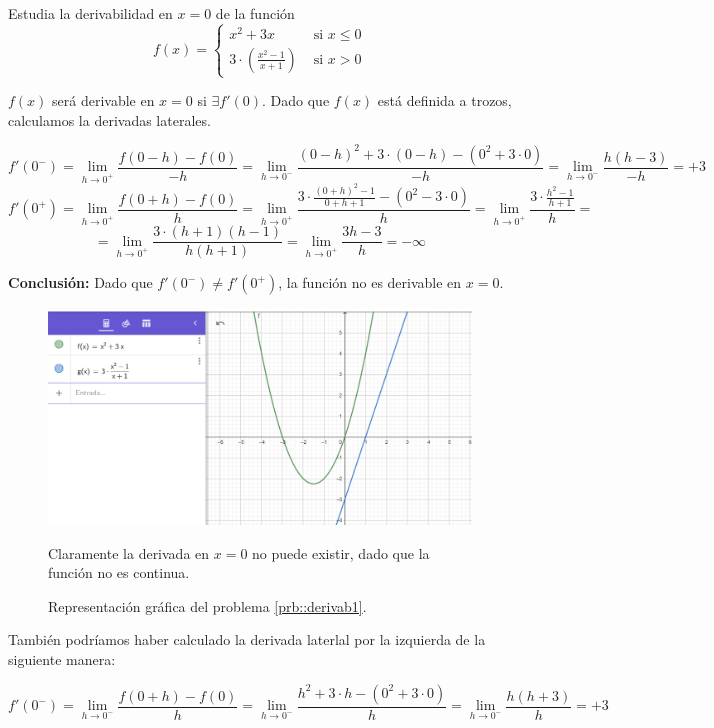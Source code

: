 \begin{problem} Estudia la derivabilidad en $x=0$ de la función 
\label{prb::derivab1}
\[f(x) = \begin{cases} x^2+3x & \text{ si } x\leq 0\\ 3·\left(\frac{x^2-1}{x+1}\right)&\text{ si } x>0\end{cases}\]
\solution

$f(x)$ será derivable en $x=0$ si $\exists f'(0)$. Dado que $f(x)$ está definida a trozos, calculamos la derivadas laterales.

\[f'(0^-) = \lim_{h\to 0^+} \frac{f(0-h)-f(0)}{-h} = \lim_{h\to 0^-} \frac{(0-h)^2+3·(0-h)-(0^2+3·0)}{-h} = \lim_{h\to 0^-} \frac{h(h-3)}{-h} = +3\]
\[f'(0^+) = \lim_{h\to 0^+} \frac{f(0+h)-f(0)}{h} = \lim_{h\to 0^+} \frac{3·\frac{(0+h)^2-1}{0+h+1} - (0^2-3·0)}{h} = \lim_{h\to 0^+} \frac{3·\frac{h^2-1}{h+1}}{h} = \]
\[=\lim_{h\to 0^+} \frac{3·(h+1)(h-1)}{h(h+1)} = \lim_{h\to 0^+} \frac{3h-3}{h} = -\infty \]

\textbf{Conclusión:} Dado que  $f'(0^-) \neq f'(0^+)$, la función no es derivable en $x=0$.

\begin{figure}[h!]
\centering
\includegraphics[scale=0.5]{img/DerivabilidadEjer1}
\label{fig::DerivabEjer1}
\caption{Representación gráfica del problema \ref{prb::derivab1}.}
Claramente la derivada en $x=0$ no puede existir, dado que la función no es continua.
\end{figure}

\obs También podríamos haber calculado la derivada laterlal por la izquierda de la siguiente manera:

\[f'(0^-) = \lim_{h\to 0^-} \frac{f(0+h)-f(0)}{h} = \lim_{h\to 0^-} \frac{h^2+3·h-(0^2+3·0)}{h} = \lim_{h\to 0^-} \frac{h(h+3)}{h} = +3\]

\end{problem}

